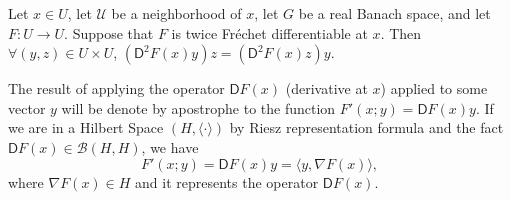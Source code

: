 \begin{fact}[]
	Let $x \in U$, let $\mathcal{U}$ be a neighborhood of $x$, let $G$ be a real Banach
	space, and let $F: U \rightarrow U$. Suppose that $F$ is twice Fr\'echet differentiable at $x$.
	Then $\forall (y,z) \in U \times U$,  $(\mathsf{D}^2 F (x)y)z = (\mathsf{D}^2 F (x)z)y$.
\end{fact}

\begin{remark}[Notation]
	The result of applying the operator $\mathsf{D}F(x)$ (derivative at $x$) applied to some vector $y$ will be denote by apostrophe to the function $F'(x; y)=\mathsf{D}F(x)y$. If we are in a Hilbert Space $(H, \langle \cdot \rangle)$ by Riesz representation formula and the fact $\mathsf{D}F(x) \in \mathcal{B}(H,H)$, we have
	\[
		F'(x; y)=\mathsf{D}F(x)y=\langle y, \nabla F(x) \rangle,
	\]
where $\nabla F(x) \in H$ and it represents the operator $\mathsf{D}F(x)$.
\end{remark}

